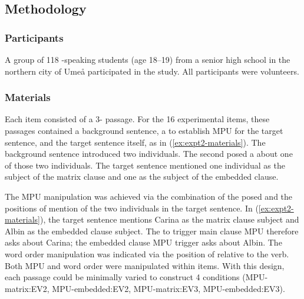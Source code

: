 \documentclass[output=paper]{langsci/langscibook}
\begin{document}
\subsection{Methodology}

\subsubsection{Participants}

A group of 118 -speaking students (age 18--19) from a senior high school in the northern  city of Ume{\aa} participated in the study. All participants were volunteers.

\subsubsection{Materials}

Each item consisted of a 3- passage.  For the 16 experimental items, these passages contained a background sentence, a  to establish MPU for the target sentence, and the target sentence itself, as in (\ref{ex:expt2-materials}).  The background sentence introduced two individuals. The second  posed a  about one of those two individuals.  The target sentence mentioned one individual as the subject of the matrix clause and one as the subject of the embedded clause.  

The MPU manipulation was achieved via the combination of the  posed and the positions of mention of the two individuals in the target sentence.  In (\ref{ex:expt2-materials}), the target sentence mentions Carina as the matrix clause subject and Albin as the embedded clause subject.  The  to trigger main clause MPU therefore asks about Carina; the embedded clause MPU trigger asks about Albin.  The word order manipulation was indicated via the position of  relative to the verb.  Both MPU and word order were manipulated within items.  With this design, each passage could be minimally varied to construct 4 conditions (MPU-matrix:EV2, MPU-embedded:EV2, MPU-matrix:EV3, MPU-embedded:EV3).  
\end{document}
